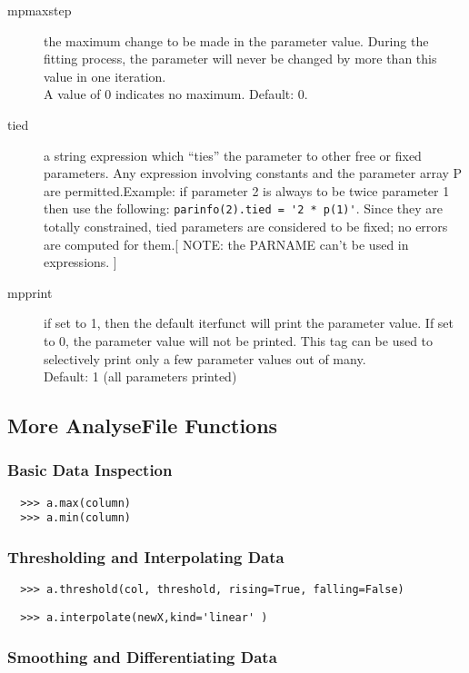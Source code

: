 \documentclass[a4paper,11pt]{scrartcl}
\begin{document}
\begin{description}
  \item[mpmaxstep] the maximum change to be made in the parameter value.  During the fitting process, the parameter will never be changed by more than this value in one iteration.\\ A value of 0 indicates no maximum.  Default: 0.
  \item[tied] a string expression which ``ties'' the parameter to other	free or fixed parameters.  Any expression involving	constants and the parameter array P are permitted.Example: if parameter 2 is always to be twice parameter 1 then use the following: \verb#parinfo(2).tied = '2 * p(1)'#. Since they are totally constrained, tied parameters are considered to be fixed; no errors are computed for them.[ NOTE: the PARNAME can't be used in expressions. ]
  \item[mpprint] if set to 1, then the default iterfunct will print the parameter value.  If set to 0, the parameter value will not be printed.  This tag can be used to selectively print only a few parameter values out of many.\\Default: 1 (all parameters printed)
\end{description}

\subsection{More AnalyseFile Functions}

\subsubsection{Basic Data Inspection}
\begin{verbatim}
  >>> a.max(column)
  >>> a.min(column)
\end{verbatim}

\subsubsection{Thresholding and Interpolating Data}
\begin{verbatim}
  >>> a.threshold(col, threshold, rising=True, falling=False)
\end{verbatim}

\begin{verbatim}
  >>> a.interpolate(newX,kind='linear' )
\end{verbatim}

\subsubsection{Smoothing and Differentiating Data}
\end{document}
